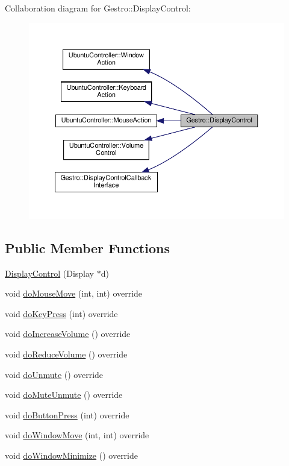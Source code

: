 Collaboration diagram for Gestro\+:\+:Display\+Control\+:
\nopagebreak
\begin{figure}[H]
\begin{center}
\leavevmode
\includegraphics[width=350pt]{classGestro_1_1DisplayControl__coll__graph}
\end{center}
\end{figure}
\subsection*{Public Member Functions}
\begin{DoxyCompactItemize}
\item 
\hyperlink{classGestro_1_1DisplayControl_a4d2a5053b250bbd1f3103795cb29fcde}{Display\+Control} (Display $\ast$d)
\item 
void \hyperlink{classGestro_1_1DisplayControl_aa8c509a1e17ba12d164dcfe43cf281d4}{do\+Mouse\+Move} (int, int) override
\item 
void \hyperlink{classGestro_1_1DisplayControl_aa5af48425f7ba40012b2a7db5fabed45}{do\+Key\+Press} (int) override
\item 
void \hyperlink{classGestro_1_1DisplayControl_a8a361b4c25ef55b86b5c2d178ffa516f}{do\+Increase\+Volume} () override
\item 
void \hyperlink{classGestro_1_1DisplayControl_a874fa3f6b3e4cf465db62a4eba1c1dd1}{do\+Reduce\+Volume} () override
\item 
void \hyperlink{classGestro_1_1DisplayControl_a210411b559d8c3ffb1498f49cfa26a6d}{do\+Unmute} () override
\item 
void \hyperlink{classGestro_1_1DisplayControl_a25f685ea6bf001e53c7d17410f2a24ea}{do\+Mute\+Unmute} () override
\item 
void \hyperlink{classGestro_1_1DisplayControl_a5f45c36e699afa1d56b2af78e5125aca}{do\+Button\+Press} (int) override
\item 
void \hyperlink{classGestro_1_1DisplayControl_aca4208c53cac28e164e7949effdc04cd}{do\+Window\+Move} (int, int) override
\item 
void \hyperlink{classGestro_1_1DisplayControl_ad5fa763a77c680ce7b2089c6d79c4eb7}{do\+Window\+Minimize} () override
\end{DoxyCompactItemize}


